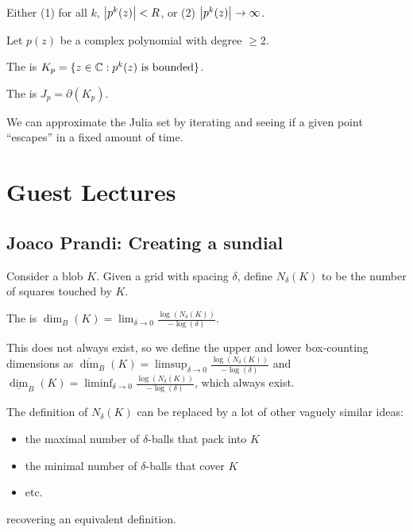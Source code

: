 \documentclass[class=pmath370,tikz,notes]{agony}
\begin{document}
\begin{remark}
  Either (1) for all $k$, $\abs{p^k(z)} < R$, or (2) $\abs{p^k(z)} \to \infty$.
\end{remark}

\begin{defn}
  Let $p(z)$ be a complex polynomial with degree $\geq 2$.

  The 
  is $K_p = \{z \in \mathbb{C} : \text{$p^k(z)$ is bounded}\}$.

  The  is $J_p = \partial(K_p)$.
\end{defn}

We can approximate the Julia set by iterating and seeing if a given point
``escapes'' in a fixed amount of time.

\chapter{Guest Lectures}

\section{Joaco Prandi: Creating a sundial}
\renewcommand{\H}{\mathcal{H}}
\begin{defn}
  Consider a blob $K$. Given a grid with spacing $\delta$,
  define $N_\delta(K)$ to be the number of squares touched by $K$.

  The  is
  $\dim_B(K) = \lim_{\delta\to0}\frac{\log(N_\delta(K))}{-\log(\delta)}$.

  This does not always exist, so we define the upper and lower box-counting
  dimensions as $\overline{\dim}_B(K) = \limsup_{\delta\to0}\frac{\log(N_\delta(K))}{-\log(\delta)}$
  and $\underline{\dim}_B(K) = \liminf_{\delta\to0}\frac{\log(N_\delta(K))}{-\log(\delta)}$,
  which always exist.
\end{defn}

The definition of $N_\delta(K)$ can be replaced by a lot of other vaguely similar ideas:
\begin{itemize}[nosep]
  \item the maximal number of $\delta$-balls that pack into $K$
  \item the minimal number of $\delta$-balls that cover $K$
  \item etc.
\end{itemize}
recovering an equivalent definition.
\end{document}
